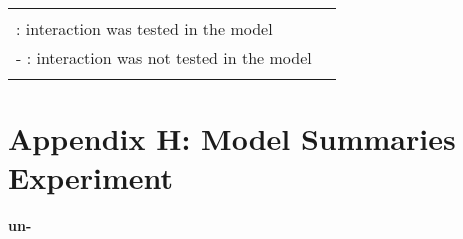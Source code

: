 \begin{table}[H]
\begin{center}
{\begin{tabular} {llrrrrr}
	\hline \\
	\multicolumn{6}{l}{\small \checkmark \hspace*{0.2cm}: interaction was tested in the model} & \\			
	\multicolumn{6}{l}{\small - \hspace*{0.45cm}: interaction was not tested in the model} & \\			
	& 
			\end{tabular}
}
\end{center}
\vspace*{-0.5cm}
\end{table}


\clearpage


\section*{Appendix H: Model Summaries Experiment} \label{Appendix H: Model Summaries Experiment}

\textbf{{un-}}

\vspace*{-0.3cm}

